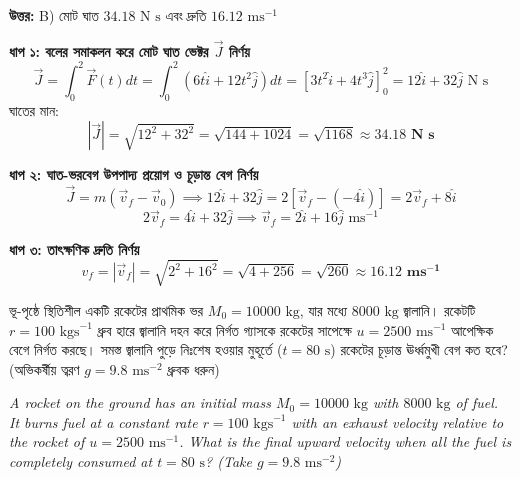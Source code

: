 \documentclass[12pt, a4paper]{article}
\begin{document}
{\begin{tcolorbox}[answerbox]
\textbf{\color{success} উত্তর:} B) মোট ঘাত $34.18\text{ N s}$ এবং দ্রুতি $16.12\text{ ms}^{-1}$
\end{tcolorbox}
\vspace{1em}

\begin{tcolorbox}[solutionbox={সমাধান (Solution)}]
\noindent
\textbf{ধাপ ১: বলের সমাকলন করে মোট ঘাত ভেক্টর $\vec{J}$ নির্ণয়} \\
\[\vec{J} = \int_0^2 \vec{F}(t) dt = \int_0^2 (6t\hat{i} + 12t^2\hat{j}) dt = \left[3t^2\hat{i} + 4t^3\hat{j}\right]_0^2 = 12\hat{i} + 32\hat{j}\text{ N s}\]
ঘাতের মান:
\[|\vec{J}| = \sqrt{12^2 + 32^2} = \sqrt{144 + 1024} = \sqrt{1168} \approx \mathbf{34.18\text{ N s}}\]

\vspace{0.5em}
\noindent\textbf{ধাপ ২: ঘাত-ভরবেগ উপপাদ্য প্রয়োগ ও চূড়ান্ত বেগ নির্ণয়} \\
\[\vec{J} = m(\vec{v}_f - \vec{v}_0) \implies 12\hat{i} + 32\hat{j} = 2[\vec{v}_f - (-4\hat{i})] = 2\vec{v}_f + 8\hat{i}\]
\[2\vec{v}_f = 4\hat{i} + 32\hat{j} \implies \vec{v}_f = 2\hat{i} + 16\hat{j}\text{ ms}^{-1}\]

\vspace{0.5em}
\noindent\textbf{ধাপ ৩: তাৎক্ষণিক দ্রুতি নির্ণয়} \\
\[v_f = |\vec{v}_f| = \sqrt{2^2 + 16^2} = \sqrt{4 + 256} = \sqrt{260} \approx \mathbf{16.12\text{ ms}^{-1}}\]
\end{tcolorbox}

\vspace{2em}

\begin{tcolorbox}[questionbox={প্রশ্ন (Question) 12}]
\noindent
ভূ-পৃষ্ঠে স্থিতিশীল একটি রকেটের প্রাথমিক ভর $M_0 = 10000\text{ kg}$, যার মধ্যে $8000\text{ kg}$ জ্বালানি। রকেটটি $r = 100\text{ kgs}^{-1}$ ধ্রুব হারে জ্বালানি দহন করে নির্গত গ্যাসকে রকেটের সাপেক্ষে $u = 2500\text{ ms}^{-1}$ আপেক্ষিক বেগে নির্গত করছে। সমস্ত জ্বালানি পুড়ে নিঃশেষ হওয়ার মুহূর্তে ($t = 80\text{ s}$) রকেটের চূড়ান্ত ঊর্ধ্বমুখী বেগ কত হবে? (অভিকর্ষীয় ত্বরণ $g = 9.8\text{ ms}^{-2}$ ধ্রুবক ধরুন)
\vspace{0.8em}
\begin{english}
\noindent\textit{\color{darkgray}
A rocket on the ground has an initial mass $M_0 = 10000\text{ kg}$ with $8000\text{ kg}$ of fuel. It burns fuel at a constant rate $r = 100\text{ kgs}^{-1}$ with an exhaust velocity relative to the rocket of $u = 2500\text{ ms}^{-1}$. What is the final upward velocity when all the fuel is completely consumed at $t = 80\text{ s}$? (Take $g = 9.8\text{ ms}^{-2}$)
}
\end{english}
\end{tcolorbox}

}
\end{document}
